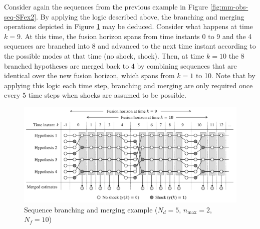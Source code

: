Consider again the sequences from the previous example in Figure \ref{fig:mm-obs-seq-SFex2}. By applying the logic described above, the branching and merging operations depicted in Figure \ref{fig:mm-obs-seq-sf95} may be deduced. Consider what happens at time $k=9$. At this time, the fusion horizon spans from time instants 0 to 9 and the 4 sequences are branched into 8 and advanced to the next time instant according to the possible modes at that time (no shock, shock). Then, at time $k=10$ the 8 branched hypotheses are merged back to 4 by combining sequences that are identical over the new fusion horizon, which spans from $k=1$ to 10. Note that by applying this logic each time step, branching and merging are only required once every 5 time steps when shocks are assumed to be possible.
\begin{figure}[htp]
	\centering
	\includegraphics[width=15cm]{images/mm_obs_seq_sf95.pdf}
	\caption{Sequence branching and merging example ($N_d=5$, $n_\text{max}=2$, $N_f=10$)}
	\label{fig:mm-obs-seq-sf95}
\end{figure}

